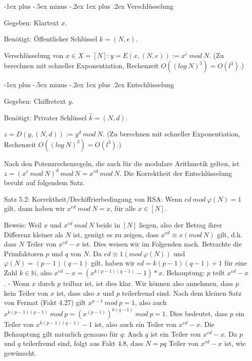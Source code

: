 \documentclass[a4paper]{article}
\makeatletter
\renewcommand{\subsubsection}{\@startsection{subsubsection}{3}{0mm}%
 {-1ex plus -.5ex minus -.2ex}%
 {1ex plus .2ex}%
 {\normalfont\small\bfseries}}
\makeatother
\begin{document}
\begin{multicols}{3}
        \subsubsection{Verschlüsselung}
        \begin{itemize*}
            \item Gegeben: Klartext $x$.
            \item  Benötigt: Öffentlicher Schlüssel $k= (N,e)$.
        \end{itemize*}

        Verschlüsselung von $x\in X= [N]: y=E(x,(N,e)) :=x^e\ mod\ N$. (Zu berechnen mit schneller Exponentiation, Rechenzeit $O((log\ N)^3) =O(l^3)$.)

        \subsubsection{Entschlüsselung}
        \begin{itemize*}
            \item Gegeben: Chiffretext $y$.
            \item  Benötigt: Privater Schlüssel $\hat{k}= (N,d)$.
        \end{itemize*}

    $z=D(y,(N,d)) :=y^d\ mod\ N$. (Zu berechnen mit schneller Exponentiation, Rechenzeit $O((log\ N)^3) =O(l^3)$.)

        Nach den Potenzrechenregeln, die auch für die modulare Arithmetik gelten, ist $z=(x^e\ mod\ N)^d\ mod\ N=x^{ed}\ mod\ N$. Die Korrektheit der Entschlüsselung beruht auf folgendem Satz.

        Satz 5.2: Korrektheit/Dechiffrierbedingung von RSA: Wenn $ed\ mod\ \varphi(N) = 1$ gilt, dann haben wir $x^{ed}\ mod\ N=x$, für alle $x\in [N]$.

        Beweis: Weil $x$ und $x^{ed}\ mod\ N$ beide in $[N]$ liegen, also der Betrag ihrer Differenz kleiner als $N$ ist, genügt es zu zeigen, dass $x^{ed} \equiv x(mod\ N)$ gilt, d.h. dass $N$ Teiler von $x^{ed}-x$ ist.
        Dies weisen wir im Folgenden nach. Betrachte die Primfaktoren $p$ und $q$ von $N$. Da $ed\equiv 1 (mod\ \varphi(N))$ und $\varphi(N) = (p-1)(q-1)$ gilt, haben wir $ed=k(p-1)(q-1) + 1$ für eine Zahl $k\in\mathbb{N}$, also $x^{ed}-x= (x^{k(p-1)(q-1)} -1)*x$.
        Behauptung: $p$ teilt $x^{ed}-x$. - Wenn $x$ durch $p$ teilbar ist, ist dies klar. Wir können also annehmen, dass $p$ kein Teiler von $x$ ist, dass also $x$ und $p$ teilerfremd sind. Nach dem kleinen Satz von Fermat (Fakt 4.27) gilt $x^{p-1}\ mod\ p= 1$, also auch $x^{k(p-1)(q-1)}\ mod\ p= (x^{(p-1)})^{k(q-1)}\ mod\ p= 1$.
        Dies bedeutet, dass $p$ ein Teiler von $x^{k(p-1)(q-1)}-1$ ist, also auch ein Teiler von $x^{ed}-x$.
        Die Behauptung gilt naturlich genauso für $q$: Auch $q$ ist ein Teiler von $x^{ed}-x$. Da $p$ und $q$ teilerfremd sind, folgt aus Fakt 4.8, dass $N=pq$ Teiler von $x^{ed}-x$ ist, wie gewünscht.


\end{multicols}
\end{document}
